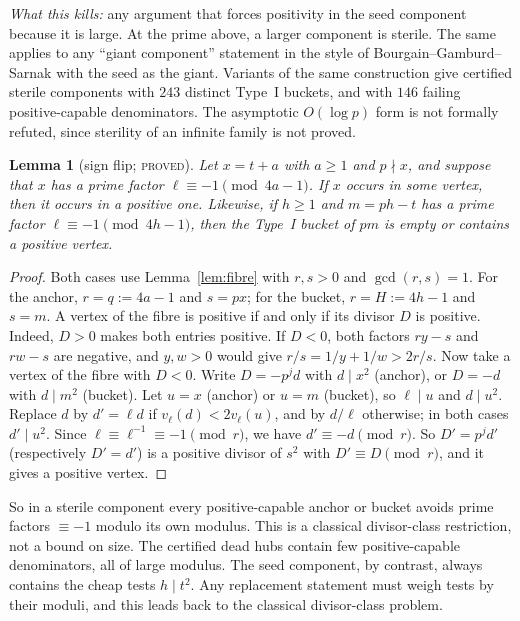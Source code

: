 \documentclass[11pt,reqno]{amsart}
\newtheorem{lemma}[theorem]{Lemma}
\theoremstyle{definition}
\newcommand{\status}[1]{\textsc{#1}}
\begin{document}
\emph{What this kills:} any argument that forces positivity in the seed
component because it is large.  At the prime above, a larger component is
sterile.  The same applies to any ``giant component'' statement in the
style of Bourgain--Gamburd--Sarnak \cite{BGS} with the seed as the giant.  Variants of the same construction give certified
sterile components with $243$ distinct Type~I buckets, and with $146$
failing positive-capable denominators.  The asymptotic $O(\log p)$ form is
not formally refuted, since sterility of an infinite family is not proved.

\begin{lemma}[sign flip; \status{proved}]\label{lem:E}
Let $x=t+a$ with $a\ge1$ and $p\nmid x$, and suppose that $x$ has a prime
factor $\ell\equiv-1\pmod{4a-1}$.  If $x$ occurs in some vertex, then it
occurs in a positive one.  Likewise, if $h\ge1$ and $m=ph-t$ has a prime
factor $\ell\equiv-1\pmod{4h-1}$, then the Type~I bucket of $pm$ is empty or
contains a positive vertex.
\end{lemma}

\begin{proof}
Both cases use Lemma~\ref{lem:fibre} with $r,s>0$ and $\gcd(r,s)=1$.  For
the anchor, $r=q:=4a-1$ and $s=px$; for the bucket, $r=H:=4h-1$ and $s=m$.
A vertex of the fibre is positive if and only if its divisor $D$ is
positive.  Indeed, $D>0$ makes both entries positive.  If $D<0$, both
factors $ry-s$ and $rw-s$ are negative, and $y,w>0$ would give
$r/s=1/y+1/w>2r/s$.  Now take a vertex of the fibre with $D<0$.  Write
$D=-p^jd$ with $d\mid x^2$ (anchor), or $D=-d$ with $d\mid m^2$ (bucket).
Let $u=x$ (anchor) or $u=m$ (bucket), so $\ell\mid u$ and $d\mid u^2$.
Replace $d$ by $d'=\ell d$ if $v_\ell(d)<2v_\ell(u)$, and by $d/\ell$
otherwise; in both cases $d'\mid u^2$.  Since $\ell\equiv\ell^{-1}\equiv-1\pmod r$, we have
$d'\equiv-d\pmod r$.  So $D'=p^jd'$ (respectively $D'=d'$) is a positive
divisor of $s^2$ with $D'\equiv D\pmod r$, and it gives a positive vertex.
\end{proof}

So in a sterile component every positive-capable anchor or bucket avoids
prime factors $\equiv-1$ modulo its own modulus.  This is a classical
divisor-class restriction, not a bound on size.  The certified dead hubs
contain few positive-capable denominators, all of large modulus.  The seed
component, by contrast, always contains the cheap tests $h\mid t^2$.  Any
replacement statement must weigh tests by their moduli, and this leads back
to the classical divisor-class problem.
\end{document}
